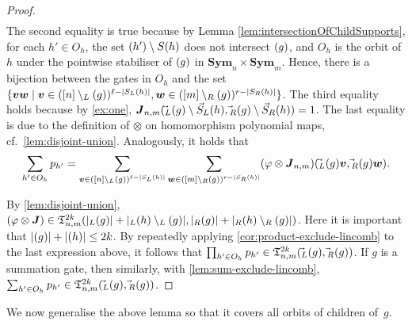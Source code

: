 \documentclass[11pt, DIV=15]{scrarticle}
\theoremstyle{definition}
\theoremstyle{plain}
\theoremstyle{remark}
\renewcommand{\phi}{\varphi}
\newcommand{\Sym}{\mathbf{Sym}}
\let\sup\relax
\DeclareMathOperator{\sup}{sup}
\begin{document}
\begin{proof}
\begin{align*}
 		\end{align*}
 		The second equality is true because by Lemma \ref{lem:intersectionOfChildSupports}, for each $h' \in O_h$, 
 		the set $\sup(h') \setminus S(h)$ does not intersect $\sup(g)$, and $O_h$ is the orbit of $h$ under the pointwise stabiliser of $\sup(g)$ in $\Sym_n \times \Sym_m$. Hence, there is a bijection between the gates in $O_h$ and the set $\{  \boldsymbol{v}\boldsymbol{w} \mid  \boldsymbol{v} \in ([n] \setminus \sup_L(g))^{\ell - |S_L(h)|},  \boldsymbol{w} \in ([m] \setminus \sup_R(g))^{r - |S_R(h)|}  \}$.
 		The third equality holds because by \cref{ex:one}, $\boldsymbol{J}_{n,m}(\vec{\sup}_L(g) \setminus \vec{S}_L(h), \vec{\sup}_R(g) \setminus \vec{S}_R(h))= 1$. The last equality is due to the definition of $\otimes$ on homomorphism polynomial maps, cf.\ \cref{lem:disjoint-union}.
 		Analogously, 
 		it holds that
 		\[
 			\sum_{h' \in O_h} p_{h'}
 			=
 			\sum_{\boldsymbol{v} \in ([n] \setminus \sup_L(g))^{\ell - |S_L(h)|}} 
 			\sum_{\boldsymbol{w} \in ([m] \setminus \sup_R(g))^{r - |S_R(h)|}} (\phi \otimes \boldsymbol{J}_{n,m})(\vec{\sup}_L(g) \boldsymbol{v}, \vec{\sup}_R(g) \boldsymbol{w}).
 		\]
 		
 		By \cref{lem:disjoint-union}, $(\phi \otimes \boldsymbol{J}) \in \mathfrak{T}_{n,m}^{2k}(|\sup_L(g)|+|\sup_L(h) \setminus \sup_L(g)|, |\sup_R(g)|+|\sup_R(h) \setminus \sup_R(g)|)$. 
 		Here it is important that $| \sup(g)| + |\sup(h)| \leq 2k$.
 		By repeatedly applying \cref{cor:product-exclude-lincomb} to the last expression above,
 		it follows that $\prod_{h' \in O_h} p_{h'} \in \mathfrak{T}^{2k}_{n,m}(\vec{\sup}_L(g), \vec{\sup}_R(g))$.
 		If $g$ is a summation gate, then similarly, with \cref{lem:sum-exclude-lincomb}, $\sum_{h' \in O_h} p_{h'} \in \mathfrak{T}^{2k}_{n,m}(\vec{\sup}_L(g), \vec{\sup}_R(g))$.
 	\end{proof}
 	
 	We now generalise the above lemma so that it covers all orbits of children of~$g$.
 	
\end{document}
